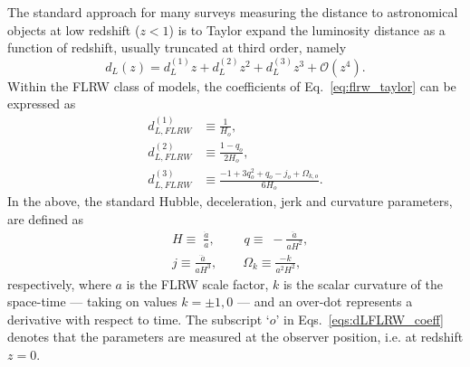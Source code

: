 \documentclass[fleqn,usenatbib]{mnras}
\begin{document}
The standard approach for many surveys measuring the distance to astronomical objects at low redshift {($z<1$)} is to Taylor expand the luminosity distance {as a function of redshift, usually truncated at third order, namely } %
\begin{equation}
d_{L}(z) = d^{(1)}_{L}z +d^{(2)}_{L}z^2+d^{(3)}_{L}z^3 + \mathcal {O}(z^4) .
\label{eq:flrw_taylor}
\end{equation}
{Within the FLRW class of models, }
the coefficients of Eq.~\eqref{eq:flrw_taylor} can be {expressed as \citep{Visser_2004}}
\begin{subequations}\label{eqs:dLFLRW_coeff}
  \begin{align}
    d^{(1)}_{L,FLRW}& \equiv \frac{1}{H_o},\\
    d^{(2)}_{L,FLRW}& \equiv \frac{1-q_o}{2H_o},\\
    d^{(3)}_{L,FLRW} & \equiv \frac{-1 + 3q_o^2 + q_o - j_o + \Omega_{k,o} }{6H_o}.
\end{align}

\end{subequations}
In the above, the standard Hubble, deceleration, jerk and curvature parameters, are defined as %
\begin{align}
\label{eq:h0}
&H \equiv \;\frac{\dot{a}}{a}, 
\quad\quad\; q \equiv\; - \frac{\ddot{a}}{aH^2},  \\
& j \equiv \frac{ \dddot{a}}{aH^3}, 
 \quad\quad \Omega_k \equiv \frac{-k}{a^2H^2}, \label{eq:omega_k}
\end{align}
respectively, where $a$ is the FLRW scale factor, $k$ is the scalar curvature of the space-time {--- taking on values $k = \pm1, 0$ ---}
{and an over-dot represents a derivative with respect to time.} {The subscript `$o$' in Eqs.~\eqref{eqs:dLFLRW_coeff} denotes that the parameters are measured at the observer position, 
i.e. at redshift $z=0$.}
\end{document}
